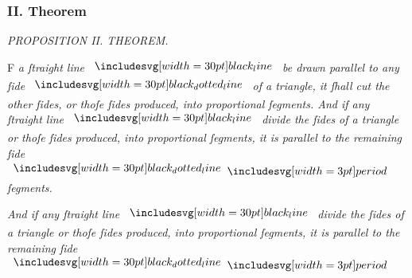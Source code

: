 \documentclass[11pt,preview]{standalone}
\begin{document}
\subsubsection{II. Theorem}

\begin{minipage}[t]{0.43\textwidth}
    \vspace{20pt}
    
\end{minipage}%
\hfill
\begin{minipage}[t]{0.54\textwidth}
    \begin{center}
        \textit{PROPOSITION II. THEOREM.}\label{book6pr2} \\
    \end{center}

    \hfill

    \begin{center}
        \raggedright \lettrine[lines=3, loversize=1, nindent=0pt]{}{}F \textit{a ſtraight line} $\blackline$ \textit{be drawn parallel to any ſide} $\dottedblackline$ \textit{of a triangle, it ſhall cut the other ſides, or thoſe ſides produced, into proportional ſegments. And if any ſtraight line} $\blackline$ \textit{divide the ſides of a triangle or thoſe ſides produced, into proportional ſegments, it is parallel to the remaining ſide} $\dottedblackline \bperiod$ \textit{ſegments.}
    \end{center}
    \raggedright \textit{And if any ſtraight line} $\blackline$ \textit{divide the ſides of a triangle or thoſe ſides produced, into proportional ſegments, it is parallel to the remaining ſide} $\dottedblackline \bperiod$
\end{minipage}

\hfill
\end{document}

